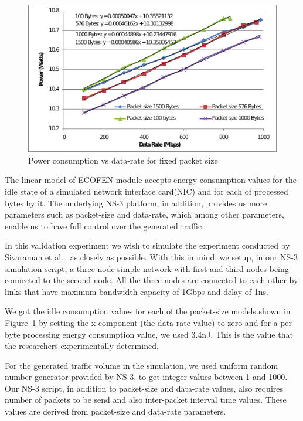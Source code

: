 \begin{figure}[ht]
	\begin{center}
		\includegraphics{images/powervsdatarate1.pdf}
		\caption{Power consumption vs data-rate for fixed packet size \cite{Sivaraman}}
		\label{fig:powervsdatarate1}
	\end{center}
\end{figure}

The linear model of ECOFEN module accepts energy consumption values for the idle state of a simulated network interface card(NIC) and for each of processed bytes by it. The underlying NS-3 platform, in addition, provides us more parameters such as packet-size and data-rate, which among other parameters, enable us to have full control over the generated traffic.

In this validation experiment we wish to simulate the experiment conducted by Sivaraman et al.{\ } as closely as possible. With this in mind, we setup, in our NS-3 simulation script, a three node simple network with first and third nodes being connected to the second node. All the three nodes are connected to each other by links that have maximum bandwidth capacity of 1Gbps and delay of 1ns. 

We got the idle consumption values for each of the packet-size models shown in Figure~\ref{fig:powervsdatarate1} by setting the x component (the data rate value) to zero and for a per-byte processing energy consumption value, we used 3.4nJ. This is the value that the researchers experimentally determined. 

For the generated traffic volume in the simulation, we used uniform random number generator provided by NS-3, to get integer values between 1 and 1000. Our NS-3 script, in addition to packet-size and data-rate values, also requires number of packets to be send and also inter-packet interval time values. These values are derived from packet-size and data-rate parameters. 

